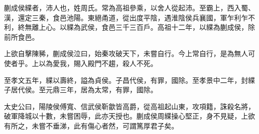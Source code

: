 蒯成侯緤者，沛人也，姓周氏。常為高祖參乘，以舍人從起沛。至霸上，西入蜀、漢，還定三秦，食邑池陽。東絕甬道，從出度平陰，遇淮陰侯兵襄國，軍乍利乍不利，終無離上心。以緤為武侯，食邑三千三百戶。高祖十二年，以緤為蒯成侯，除前所食邑。

上欲自擊陳豨，蒯成侯泣曰，始秦攻破天下，未嘗自行。今上常自行，是為無人可使者乎。上以為愛我，賜入殿門不趨，殺人不死。

至孝文五年，緤以壽終，謚為貞侯。子昌代侯，有罪，國除。至孝景中二年，封緤子居代侯。至元鼎三年，居為太常，有罪，國除。

太史公曰，陽陵侯傅寬、信武侯靳歙皆高爵，從高祖起山東，攻項籍，誅殺名將，破軍降城以十數，未嘗困辱，此亦天授也。蒯成侯周緤操心堅正，身不見疑，上欲有所之，未嘗不垂涕，此有傷心者然，可謂篤厚君子矣。